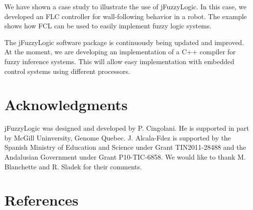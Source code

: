 \documentclass[11pt,twoside]{article}
\begin{document}
\begin{multicols}{2}
We have shown a case study to illustrate the use of jFuzzyLogic. 
In this case, we developed an FLC controller for wall-following behavior in a robot.
The example shows how FCL can be used to easily implement fuzzy logic systems.

The jFuzzyLogic software package is continuously being updated and improved. 
At the moment, we are developing an implementation of a C++ compiler for fuzzy inference systems. 
This will allow easy implementation with embedded control systems using different processors.

\section*{Acknowledgments}

jFuzzyLogic was designed and developed by P. Cingolani. He is supported in part by McGill Uninversity, Genome Quebec. 
J. Alcala-Fdez is supported by the Spanish Ministry of Education and Science under Grant TIN2011-28488 and the Andalusian Government under Grant P10-TIC-6858.
We would like to thank M. Blanchette and R. Sladek for their comments.


\section*{References}




\end{multicols}
\end{document}
